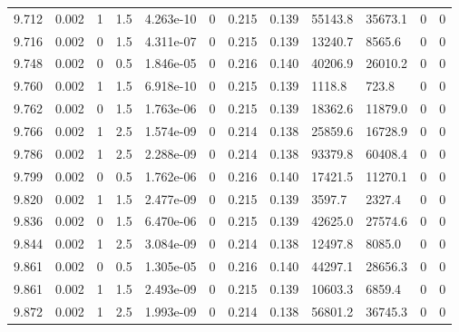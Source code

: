 \documentclass[preview]{standalone}
\begin{document}
{{{{{{{{{{{{{{{{{\begin{tabular}{L{1.2cm}C{1.2cm} C{0.3cm}C{0.5cm} C{1.4cm}C{1.4cm} C{1.4cm}C{1.4cm} C{1.6cm}C{1.6cm} C{1.6cm}C{1.6cm}}
  9.712  &  0.002  & 1     & 1.5 &  4.263e-10  & 0  &  0.215&   0.139& 55143.8 & 35673.1   &  0 & 0  \\ 
  9.716  &  0.002  & 0     & 1.5 &  4.311e-07  & 0  &  0.215&   0.139& 13240.7 & 8565.6   &  0 & 0  \\ 
  9.748  &  0.002  & 0     & 0.5 &  1.846e-05  & 0  &  0.216&   0.140& 40206.9 & 26010.2   &  0 & 0  \\ 
  9.760  &  0.002  & 1     & 1.5 &  6.918e-10  & 0  &  0.215&   0.139& 1118.8 & 723.8   &  0 & 0  \\ 
  9.762  &  0.002  & 0     & 1.5 &  1.763e-06  & 0  &  0.215&   0.139& 18362.6 & 11879.0   &  0 & 0  \\ 
  9.766  &  0.002  & 1     & 2.5 &  1.574e-09  & 0  &  0.214&   0.138& 25859.6 & 16728.9   &  0 & 0  \\ 
  9.786  &  0.002  & 1     & 2.5 &  2.288e-09  & 0  &  0.214&   0.138& 93379.8 & 60408.4   &  0 & 0  \\ 
  9.799  &  0.002  & 0     & 0.5 &  1.762e-06  & 0  &  0.216&   0.140& 17421.5 & 11270.1   &  0 & 0  \\ 
  9.820  &  0.002  & 1     & 1.5 &  2.477e-09  & 0  &  0.215&   0.139& 3597.7 & 2327.4   &  0 & 0  \\ 
  9.836  &  0.002  & 0     & 1.5 &  6.470e-06  & 0  &  0.215&   0.139& 42625.0 & 27574.6   &  0 & 0  \\ 
  9.844  &  0.002  & 1     & 2.5 &  3.084e-09  & 0  &  0.214&   0.138& 12497.8 & 8085.0   &  0 & 0  \\ 
  9.861  &  0.002  & 0     & 0.5 &  1.305e-05  & 0  &  0.216&   0.140& 44297.1 & 28656.3   &  0 & 0  \\ 
  9.861  &  0.002  & 1     & 1.5 &  2.493e-09  & 0  &  0.215&   0.139& 10603.3 & 6859.4   &  0 & 0  \\ 
  9.872  &  0.002  & 1     & 2.5 &  1.993e-09  & 0  &  0.214&   0.138& 56801.2 & 36745.3   &  0 & 0  \\ 
\hline 
\end{tabular} 

}}}}}}}}}}}}}}}}}
\end{document}
